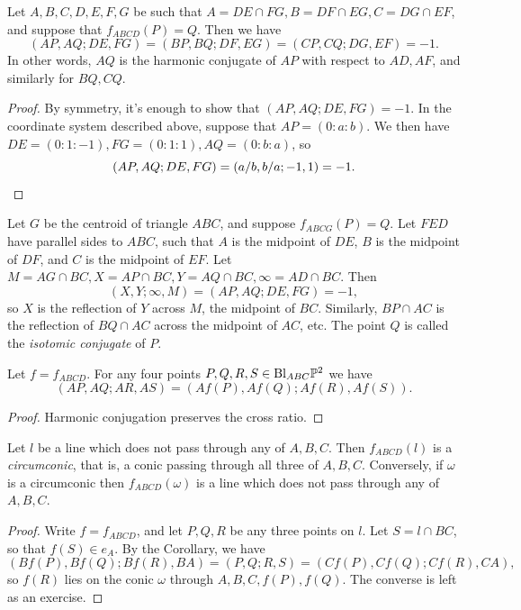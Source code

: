 \begin{prop} Let $A,B,C,D,E,F,G$ be such that $A = DE\cap FG, B = DF\cap EG, C = DG\cap EF$, and suppose that $f_{ABCD}(P) = Q$. Then we have
\[
(AP,AQ;DE,FG) = (BP,BQ;DF,EG) = (CP,CQ;DG,EF) = -1.
\]
In other words, $AQ$ is the harmonic conjugate of $AP$ with respect to $AD, AF$, and similarly for $BQ, CQ$.
\end{prop}
\begin{proof} By symmetry, it's enough to show that $(AP,AQ;DE,FG) = -1$. In the coordinate system described above, suppose that $AP = (0:a:b)$. We then have $DE = (0:1:-1), FG = (0:1:1), AQ = (0:b:a)$, so
\[
(AP,AQ;DE,FG) = (a/b,b/a;-1,1) = -1.\qedhere
\]
\end{proof}

\begin{ex} Let $G$ be the centroid of triangle $ABC$, and suppose $f_{ABCG}(P) = Q$. Let $FED$ have parallel sides to $ABC$, such that $A$ is the midpoint of $DE$, $B$ is the midpoint of $DF$, and $C$ is the midpoint of $EF$. Let $M = AG\cap BC, X = AP \cap BC, Y = AQ \cap BC,\infty = AD\cap BC$. Then
\[
(X,Y;\infty,M) = (AP,AQ;DE,FG) = -1,
\]
so $X$ is the reflection of $Y$ across $M$, the midpoint of $BC$. Similarly, $BP\cap AC$ is the reflection of $BQ\cap AC$ across the midpoint of $AC$, etc. The point $Q$ is called the \emph{isotomic conjugate} of $P$.
\end{ex}

\begin{cor}\label{cremona-cross} Let $f = f_{ABCD}$. For any four points $P,Q,R,S\in \text{\rm Bl}_{ABC}\mathbb{P}^2$ we have
\[
(AP,AQ;AR,AS) = (Af(P),Af(Q);Af(R),Af(S)).
\]
\end{cor}
\begin{proof} Harmonic conjugation preserves the cross ratio.
\end{proof}

\begin{thm}\label{cremona-conic} Let $l$ be a line which does not pass through any of $A,B,C$. Then $f_{ABCD}(l)$ is a \emph{circumconic}, that is, a conic passing through all three of $A,B,C$. Conversely, if $\omega$ is a circumconic then $f_{ABCD}(\omega)$ is a line which does not pass through any of $A,B,C$.
\end{thm}
\begin{proof} Write $f = f_{ABCD}$, and let $P,Q,R$ be any three points on $l$. Let $S = l\cap BC$, so that $f(S) \in e_A$. By the Corollary, we have
\[
(Bf(P),Bf(Q);Bf(R),BA) = (P,Q;R,S) = (Cf(P),Cf(Q);Cf(R),CA),
\]
so $f(R)$ lies on the conic $\omega$ through $A,B,C,f(P),f(Q)$. The converse is left as an exercise.
\end{proof}

